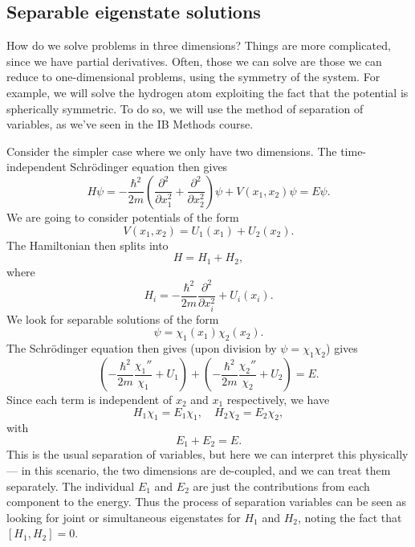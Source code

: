 \documentclass[a4paper]{article}
\begin{document}
\subsection{Separable eigenstate solutions}
How do we solve problems in three dimensions? Things are more complicated, since we have partial derivatives. Often, those we can solve are those we can reduce to one-dimensional problems, using the symmetry of the system. For example, we will solve the hydrogen atom exploiting the fact that the potential is spherically symmetric. To do so, we will use the method of separation of variables, as we've seen in the IB Methods course.

Consider the simpler case where we only have two dimensions. The time-independent Schr\"odinger equation then gives
\[
  H\psi = -\frac{\hbar^2}{2m} \left(\frac{\partial^2}{\partial x_1^2} + \frac{\partial^2}{\partial x_2^2}\right)\psi + V(x_1, x_2)\psi = E\psi.
\]
We are going to consider potentials of the form
\[
  V(x_1, x_2) = U_1(x_1) + U_2(x_2).
\]
The Hamiltonian then splits into
\[
  H = H_1 + H_2,
\]
where
\[
  H_i = -\frac{\hbar^2}{2m} \frac{\partial^2}{\partial x_i^2} + U_i(x_i).
\]
We look for separable solutions of the form
\[
  \psi = \chi_1(x_1) \chi_2(x_2).
\]
The Schr\"odinger equation then gives (upon division by $\psi = \chi_1\chi_2$) gives
\[
  \left(-\frac{\hbar^2}{2m}\frac{\chi_1''}{\chi_1} + U_1\right) + \left(-\frac{\hbar^2}{2m}\frac{\chi_2''}{\chi_2} + U_2\right) = E.
\]
Since each term is independent of $x_2$ and $x_1$ respectively, we have
\[
  H_1 \chi_1 = E_1 \chi_1, \quad H_2 \chi_2 = E_2 \chi_2,
\]
with
\[
  E_1 + E_2 = E.
\]
This is the usual separation of variables, but here we can interpret this physically --- in this scenario, the two dimensions are de-coupled, and we can treat them separately. The individual $E_1$ and $E_2$ are just the contributions from each component to the energy. Thus the process of separation variables can be seen as looking for joint or simultaneous eigenstates for $H_1$ and $H_2$, noting the fact that $[H_1, H_2] = 0$.
\end{document}
